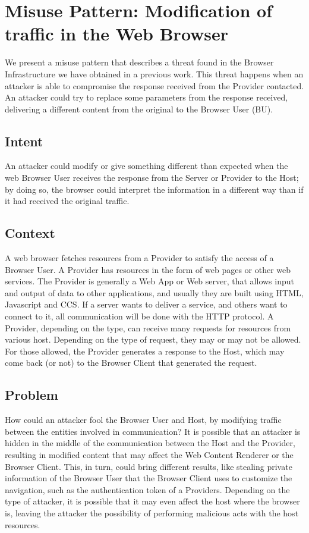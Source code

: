 \documentclass{sig-alternate-05-2015}
\begin{document}
\section{Misuse Pattern: Modification of traffic in the Web Browser}
We present a misuse pattern that describes a threat found in the Browser Infrastructure we have obtained in a previous work. This threat happens when an attacker is able to compromise the response received from the Provider contacted. An attacker could try to replace some parameters from the response received, delivering a different content from the original to the Browser User (BU).

\subsection*{Intent}
An attacker could modify or give something different than expected when the web Browser User receives the response from the Server or Provider to the Host; by doing so, the browser could interpret the information in a different way than if it had received the original traffic.

\subsection*{Context}
A web browser fetches resources from a Provider to satisfy the access of a Browser User. A Provider has resources in the form of web pages or other web services. The Provider is generally a Web App or Web server, that allows input and output of data to other applications, and usually they are built using HTML, Javascript and CCS. If a server wants to deliver a service, and others want to connect to it, all communication will be done with the HTTP protocol. A Provider, depending on the type, can receive many requests for resources from various host. Depending on the type of request, they may or may not be allowed. For those allowed, the Provider generates a response to the Host, which may come back (or not) to the Browser Client that generated the request.

\subsection*{Problem}
How could an attacker fool the Browser User and Host, by modifying traffic between the entities involved in communication? It is possible that an attacker is hidden in the middle of the communication between the Host and the Provider, resulting in modified content that may affect the Web Content Renderer or the Browser Client. This, in turn, could bring different results, like stealing private information of the Browser User that the Browser Client uses to customize the navigation, such as the authentication token of a Providers. Depending on the type of attacker, it is possible that it may even affect the host where the browser is, leaving the attacker the possibility of performing malicious acts with the host resources.
\end{document}
